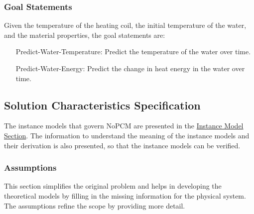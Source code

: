 \documentclass[12pt]{article}
\begin{document}
\subsubsection{Goal Statements}
\label{Sec:GoalStmt}
Given the temperature of the heating coil, the initial temperature of the water, and the material properties, the goal statements are:

\begin{itemize}
\item[Predict-Water-Temperature:\phantomsection\label{waterTempGS}]{Predict the temperature of the water over time.}
\item[Predict-Water-Energy:\phantomsection\label{waterEnergyGS}]{Predict the change in heat energy in the water over time.}
\end{itemize}
\subsection{Solution Characteristics Specification}
\label{Sec:SolCharSpec}
The instance models that govern NoPCM are presented in the \hyperref[Sec:IMs]{Instance Model Section}. The information to understand the meaning of the instance models and their derivation is also presented, so that the instance models can be verified.

\subsubsection{Assumptions}
\label{Sec:Assumps}
This section simplifies the original problem and helps in developing the theoretical models by filling in the missing information for the physical system. The assumptions refine the scope by providing more detail.
\end{document}
